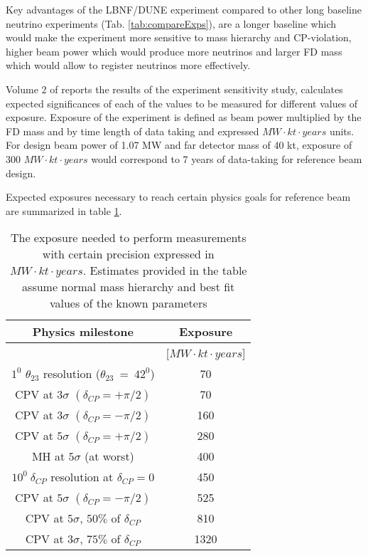 Key advantages of the LBNF/DUNE experiment compared to other long baseline neutrino experiments (Tab. \ref{tab:compareExps}), are a longer baseline which would make the experiment more sensitive to mass hierarchy and CP-violation, higher beam power which would produce more neutrinos and larger FD mass which would allow to register neutrinos more effectively. 

Volume 2 of \cite{ref_LBNF_CDR} reports the results of the experiment sensitivity study, calculates expected significances of each of the values to be measured for different values of exposure. Exposure of the experiment is defined as beam power multiplied by the FD mass and by time length of data taking and expressed   $MW \cdot kt \cdot years$ units. For design beam power of 1.07 MW and far detector mass of 40 kt, exposure of 300 $MW \cdot kt \cdot years$ would correspond to 7 years of data-taking for reference beam design.

Expected exposures necessary to reach certain physics goals for reference beam are summarized in table \ref{tab:exposures_needed}.


\begin{table}[h]
  \centering
  \begin{center}
  \caption{ The exposure needed to perform measurements with certain precision expressed in $MW \cdot kt \cdot years$. Estimates provided in the table assume normal mass hierarchy and best fit values of the known parameters }
  \begin{tabular}{|c|c|}
  \hline  
  Physics milestone & Exposure  \\ \hline
   & [$MW \cdot kt \cdot years$]  \\ \hline
  $1^0$ $\theta_{23}$ resolution ($\theta_{23}~=~42^0$) & 70 \\ \hline
  CPV at $3\sigma$ $(\delta_{CP}=+\pi/2)$ & 70  \\ \hline
  CPV at $3\sigma$ $(\delta_{CP}=-\pi/2)$ & 160  \\ \hline
  CPV at $5\sigma$ $(\delta_{CP}=+\pi/2)$ & 280  \\ \hline
  MH at $5\sigma$ (at worst) & 400  \\ \hline
  $10^0~\delta_{CP}$ resolution at $\delta_{CP}=0$ & 450  \\ \hline
  CPV at $5\sigma$ $(\delta_{CP}=-\pi/2)$ & 525  \\ \hline
  CPV at $5\sigma$, $50\%$ of $\delta_{CP}$ & 810  \\ \hline
  CPV at $3\sigma$, $75\%$ of $\delta_{CP}$ & 1320  \\ \hline
  \end{tabular}
  \label{tab:exposures_needed}
  \end{center}
\end{table}

